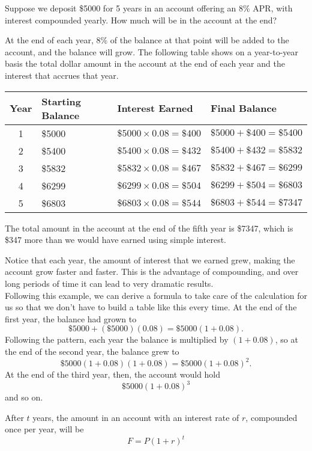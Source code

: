Suppose we deposit \$5000 for 5 years in an account offering an 8\% APR, with interest compounded yearly.  How much will be in the account at the end?

At the end of each year, 8\% of the balance at that point will be added to the account, and the balance will grow.  The following table shows on a year-to-year basis the total dollar amount in the account at the end of each year and the interest that accrues that year.
\begin{center}
\begin{tabular}{| c | p{1in} | p{1.52in} | p{1.5in} |}
\hline
{\small Year} & {\small Starting Balance} & {\small Interest Earned} & {\small Final Balance}\\
\hline
1 & \$5000 & $\$5000 \times 0.08 = \$400$ & $\$5000 + \$400 = \$5400$\\
\hline
2 & \$5400 & $\$5400 \times 0.08 = \$432$ & $\$5400 + \$432 = \$5832$\\
\hline
3 & \$5832 & $\$5832 \times 0.08 = \$467$ & $\$5832 + \$467 = \$6299$\\
\hline
4 & \$6299 & $\$6299 \times 0.08 = \$504$ & $\$6299 + \$504 = \$6803$\\
\hline
5 & \$6803 & $\$6803 \times 0.08 = \$544$ & $\$6803 + \$544 = \$7347$\\
\hline
\end{tabular}
\end{center}
The total amount in the account at the end of the fifth year is \$7347, which is \$347 more than we would have earned using simple interest.

Notice that each year, the amount of interest that we earned grew, making the account grow faster and faster.  This is the advantage of compounding, and over long periods of time it can lead to very dramatic results.\\

Following this example, we can derive a formula to take care of the calculation for us so that we don't have to build a table like this every time.  At the end of the first year, the balance had grown to \[\$5000+(\$5000)(0.08) = \$5000(1+0.08).\]  Following the pattern, each year the balance is multiplied by $(1+0.08)$, so at the end of the second year, the balance grew to 
\[\$5000(1+0.08)(1+0.08) = \$5000(1+0.08)^2.\]  At the end of the third year, then, the account would hold \[\$5000(1+0.08)^3\] and so on.  

After $t$ years, the amount in an account with an interest rate of $r$, compounded once per year, will be \[F=P(1+r)^t\]

